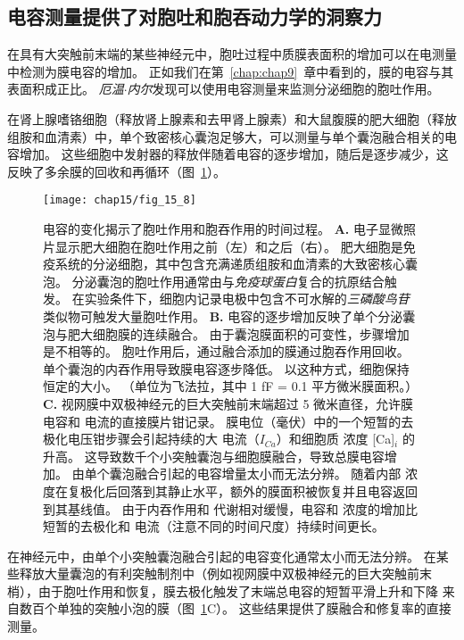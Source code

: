 \subsection{电容测量提供了对胞吐和胞吞动力学的洞察力}

在具有大突触前末端的某些神经元中，胞吐过程中质膜表面积的增加可以在电测量中检测为膜电容的增加。
正如我们在第~\ref{chap:chap9}~章中看到的，膜的电容与其表面积成正比。
\textit{厄温$\cdot$内尔}发现可以使用电容测量来监测分泌细胞的胞吐作用。


在肾上腺嗜铬细胞（释放肾上腺素和去甲肾上腺素）和大鼠腹膜的肥大细胞（释放组胺和血清素）中，单个致密核心囊泡足够大，可以测量与单个囊泡融合相关的电容增加。
这些细胞中发射器的释放伴随着电容的逐步增加，随后是逐步减少，这反映了多余膜的回收和再循环（图~\ref{fig:15_8}）。


\begin{figure}[htbp]
	\centering
	\texttt{[image: chap15/fig\_15\_8]}
	\caption{电容的变化揭示了胞吐作用和胞吞作用的时间过程。
		\textbf{A.} 电子显微照片显示肥大细胞在胞吐作用之前（左）和之后（右）。
		肥大细胞是免疫系统的分泌细胞，其中包含充满递质组胺和血清素的大致密核心囊泡。
		分泌囊泡的胞吐作用通常由与\textit{免疫球蛋白}复合的抗原结合触发。
		在实验条件下，细胞内记录电极中包含不可水解的\textit{三磷酸鸟苷}类似物可触发大量胞吐作用。
		\textbf{B.} 电容的逐步增加反映了单个分泌囊泡与肥大细胞膜的连续融合。
		由于囊泡膜面积的可变性，步骤增加是不相等的。
		胞吐作用后，通过融合添加的膜通过胞吞作用回收。
		单个囊泡的内吞作用导致膜电容逐步降低。
		以这种方式，细胞保持恒定的大小。 （单位为飞法拉，其中 1 fF = 0.1 平方微米膜面积。）\cite{fernandez1984capacitance}
		\textbf{C.} 视网膜中双极神经元的巨大突触前末端超过 5 微米直径，允许膜电容和  电流的直接膜片钳记录。
		膜电位（毫伏）中的一个短暂的去极化电压钳步骤会引起持续的大  电流（$I_{Ca}$）和细胞质  浓度 [Ca]$_i$ 的升高。
		这导致数千个小突触囊泡与细胞膜融合，导致总膜电容增加。
		由单个囊泡融合引起的电容增量太小而无法分辨。
		随着内部  浓度在复极化后回落到其静止水平，额外的膜面积被恢复并且电容返回到其基线值。
		由于内吞作用和  代谢相对缓慢，电容和  浓度的增加比短暂的去极化和  电流（注意不同的时间尺度）持续时间更长\cite{zenisek2004visualizing}。}
	\label{fig:15_8}
\end{figure}


在神经元中，由单个小突触囊泡融合引起的电容变化通常太小而无法分辨。
在某些释放大量囊泡的有利突触制剂中（例如视网膜中双极神经元的巨大突触前末梢），由于胞吐作用和恢复，膜去极化触发了末端总电容的短暂平滑上升和下降 来自数百个单独的突触小泡的膜（图~\ref{fig:15_8}C）。 
这些结果提供了膜融合和修复率的直接测量。



